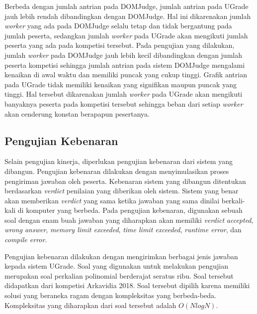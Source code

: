 \par Berbeda dengan jumlah antrian pada DOMJudge, jumlah antrian pada UGrade jauh lebih rendah dibandingkan dengan DOMJudge. Hal ini dikarenakan jumlah \textit{worker} yang ada pada DOMJudge selalu tetap dan tidak bergantung pada jumlah peserta, sedangkan jumlah \textit{worker} pada UGrade akan mengikuti jumlah peserta yang ada pada kompetisi tersebut. Pada pengujian yang dilakukan, jumlah \textit{worker} pada DOMJudge jauh lebih kecil dibandingkan dengan jumlah peserta kompetisi sehingga jumlah antrian pada sistem DOMJudge mengalami kenaikan di awal waktu dan memiliki puncak yang cukup tinggi. Grafik antrian pada UGrade tidak memiliki kenaikan yang signifikan maupun puncak yang tinggi. Hal tersebut dikarenakan jumlah \textit{worker} pada UGrade akan mengikuti banyaknya peserta pada kompetisi tersebut sehingga beban dari setiap \textit{worker} akan cenderung konstan berapapun pesertanya.

\subsection{Pengujian Kebenaran}

\par Selain pengujian kinerja, diperlukan pengujian kebenaran dari sistem yang dibangun. Pengujian kebenaran dilakukan dengan menyimulasikan proses pengiriman jawaban oleh peserta. Kebenaran sistem yang dibangun ditentukan berdasarkan \textit{verdict} penilaian yang diberikan oleh sistem. Sistem yang benar akan memberikan \textit{verdict} yang sama ketika jawaban yang sama dinilai berkali-kali di komputer yang berbeda. Pada pengujian kebenaran, digunakan sebuah soal dengan enam buah jawaban yang diharapkan akan memiliki \textit{verdict} \textit{accepted}, \textit{wrong answer}, \textit{memory limit exceeded}, \textit{time limit exceeded}, \textit{runtime error}, dan \textit{compile error}.

\par Pengujian kebenaran dilakukan dengan mengirimkan berbagai jenis jawaban kepada sistem UGrade. Soal yang digunakan untuk melakukan pengujian merupakan soal perkalian polinomial berderajat seratus ribu. Soal tersebut didapatkan dari kompetisi Arkavidia 2018. Soal tersebut dipilih karena memiliki solusi yang beraneka ragam dengan kompleksitas yang berbeda-beda. Kompleksitas yang diharapkan dari soal tersebut adalah $O(N log N)$.

